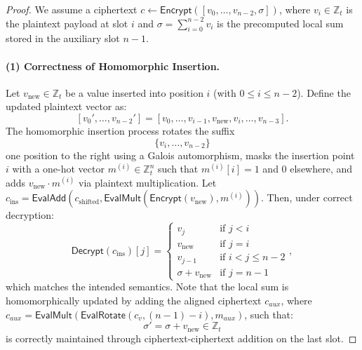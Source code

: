 \documentclass[sigconf,nonacm]{acmart}
\begin{document}
\begin{proof}

We assume a ciphertext $c \leftarrow \mathsf{Encrypt}([v_0, \dots, v_{n-2}, \sigma])$, where $v_i \in \mathbb{Z}_t$ is the plaintext payload at slot $i$ and $\sigma = \sum_{i=0}^{n-2} v_i$ is the precomputed local sum stored in the auxiliary slot $n-1$.

\paragraph{(1) Correctness of Homomorphic Insertion.}
Let $v_{\text{new}} \in \mathbb{Z}_t$ be a value inserted into position $i$ (with $0 \leq i \leq n-2$). Define the updated plaintext vector as:
$$[v_0', \dots, v_{n-2}'] = [v_0, \dots, v_{i-1}, v_{\text{new}}, v_i, \dots, v_{n-3}].$$
The homomorphic insertion process rotates the suffix 
$$\{v_i, \dots, v_{n-2}\}$$ 
one position to the right using a Galois automorphism, masks the insertion point $i$ with a one-hot vector $m^{(i)} \in \mathbb{Z}_t^n$ such that $m^{(i)}[i] = 1$ and $0$ elsewhere, and adds $v_{\text{new}} \cdot m^{(i)}$ via plaintext multiplication.
Let $c_{\text{ins}} = \mathsf{EvalAdd}(c_{\text{shifted}}, \mathsf{EvalMult}(\mathsf{Encrypt}(v_{\text{new}}), m^{(i)}))$. 
Then, under correct decryption:
$$\mathsf{Decrypt}(c_{\text{ins}})[j] = \begin{cases} v_j & \text{if } j < i \\ v_{\text{new}} & \text{if } j = i \\ v_{j-1} & \text{if } i < j \leq n-2 \\ \sigma + v_{\text{new}} & \text{if } j = n-1 \end{cases},$$
which matches the intended semantics. 
Note that the local sum is homomorphically updated by adding the aligned ciphertext $c_{aux}$, where $c_{aux} = \mathsf{EvalMult}(\mathsf{EvalRotate}(c_v, (n-1)-i), m_{aux})$, such that:
$$\sigma' = \sigma + v_{\text{new}} \in \mathbb{Z}_t$$
is correctly maintained through ciphertext-ciphertext addition on the last slot.


\end{proof}
\end{document}
